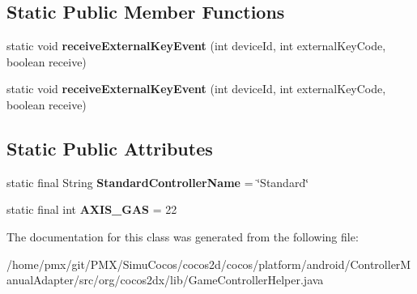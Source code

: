 \subsection*{Static Public Member Functions}
\begin{DoxyCompactItemize}
\item 
\mbox{\label{classorg_1_1cocos2dx_1_1lib_1_1GameControllerHelper_a5ca30f7968dea51b85ae8599770d087b}} 
static void {\bfseries receive\+External\+Key\+Event} (int device\+Id, int external\+Key\+Code, boolean receive)
\item 
\mbox{\label{classorg_1_1cocos2dx_1_1lib_1_1GameControllerHelper_a5ca30f7968dea51b85ae8599770d087b}} 
static void {\bfseries receive\+External\+Key\+Event} (int device\+Id, int external\+Key\+Code, boolean receive)
\end{DoxyCompactItemize}
\subsection*{Static Public Attributes}
\begin{DoxyCompactItemize}
\item 
\mbox{\label{classorg_1_1cocos2dx_1_1lib_1_1GameControllerHelper_a548d6d5e69d72ea896553e5acf7d3aae}} 
static final String {\bfseries Standard\+Controller\+Name} = \char`\"{}Standard\char`\"{}
\item 
\mbox{\label{classorg_1_1cocos2dx_1_1lib_1_1GameControllerHelper_abf97cc9a7ed7d56a8a762eb40b9b3f0d}} 
static final int {\bfseries A\+X\+I\+S\+\_\+\+G\+AS} = 22
\end{DoxyCompactItemize}


The documentation for this class was generated from the following file\+:\begin{DoxyCompactItemize}
\item 
/home/pmx/git/\+P\+M\+X/\+Simu\+Cocos/cocos2d/cocos/platform/android/\+Controller\+Manual\+Adapter/src/org/cocos2dx/lib/Game\+Controller\+Helper.\+java\end{DoxyCompactItemize}
